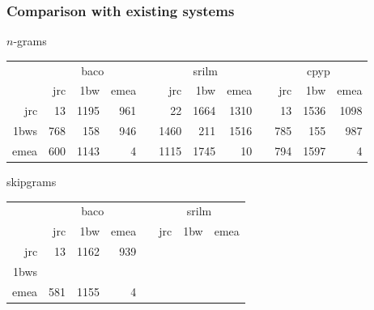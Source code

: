 \begin{frame}
    \frametitle{Comparison with existing systems}

    \begin{block}{$n$-grams}
    {\small
        \begin{tabular}{rrrrm{0.01cm}rrrm{0.01cm}rrr}
            & \multicolumn{3}{c}{baco} & & \multicolumn{3}{c}{srilm} & & \multicolumn{3}{c}{cpyp} \\
                  & jrc & 1bw  & emea & & jrc  & 1bw  & emea & & jrc & 1bw  & emea \\ \cline{2-4}\cline{6-8}\cline{10-12}
            jrc   & 13  & 1195 & 961  & & 22   & 1664 & 1310 & & 13  & 1536 & 1098 \\
            1bws  & 768 & 158  & 946  & & 1460 & 211  & 1516 & & 785 & 155  & 987 \\
            emea  & 600 & 1143 & 4    & & 1115 & 1745 & 10   & & 794 & 1597 & 4
        \end{tabular}
    }
    \end{block}
    
    \begin{block}{skipgrams}
    {\small
        \begin{tabular}{rrrrm{0.01cm}rrr}
            & \multicolumn{3}{c}{baco} & & \multicolumn{3}{c}{srilm} \\
                  & jrc & 1bw  & emea & & jrc  & 1bw  & emea  \\ \cline{2-4}\cline{6-8}
            jrc   & 13  & 1162 & 939 & &      &      &       \\
            1bws  &     &      &     & &      &      &       \\
            emea  & 581 & 1155 & 4   & &      &      &      
        \end{tabular}
    }
    \end{block}

\end{frame}

